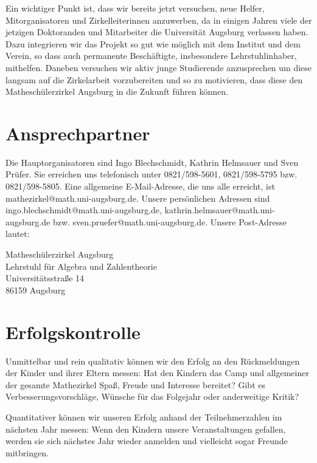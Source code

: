 \documentclass[12pt]{zettel}
\begin{document}
Ein wichtiger Punkt ist, dass wir bereits jetzt versuchen, neue Helfer,
Mitorganisatoren und Zirkelleiterinnen anzuwerben, da in einigen Jahren
viele der jetzigen Doktoranden und Mitarbeiter die Universität Augsburg
verlassen haben. Dazu integrieren wir das Projekt so gut wie möglich mit
dem Institut und dem Verein, so dass auch permanente Beschäftigte,
insbesondere Lehrstuhlinhaber, mithelfen. Daneben versuchen wir aktiv
junge Studierende anzusprechen um diese langsam auf die Zirkelarbeit
vorzubereiten und so zu motivieren, dass diese den Matheschülerzirkel
Augsburg in die Zukunft führen können.


\section{Ansprechpartner}

Die Hauptorganisatoren sind Ingo Blechschmidt, Kathrin Helmsauer und Sven
Prüfer. Sie erreichen uns telefonisch unter 0821/598-5601, 0821/598-5795 bzw.
0821/598-5805. Eine allgemeine E-Mail-Adresse, die uns alle erreicht, ist
\textsf{mathezirkel@math.uni-augsburg.de}. Unsere persönlichen Adressen sind
\textsf{ingo.blechschmidt@math.uni-augsburg.de},
\textsf{kathrin.helmsauer@math.uni-augsburg.de} bzw.
\textsf{sven.pruefer@math.uni-augsburg.de}. Unsere Post-Adresse lautet:

\begin{tabbing}
  Matheschülerzirkel Augsburg \\
  Lehrstuhl für Algebra und Zahlentheorie \\
  Universitätsstraße 14 \\
  86159 Augsburg
\end{tabbing}


\section{Erfolgskontrolle}

Unmittelbar und rein qualitativ können wir den Erfolg an den Rückmeldungen der
Kinder und ihrer Eltern messen: Hat den Kindern das Camp und allgemeiner der
gesamte Mathezirkel Spaß, Freude und Interesse bereitet? Gibt es
Verbesserungsvorschläge, Wünsche für das Folgejahr oder anderweitige Kritik?

Quantitativer können wir unseren Erfolg anhand der Teilnehmerzahlen im nächsten
Jahr messen: Wenn den Kindern unsere Veranstaltungen gefallen, werden sie sich
nächstes Jahr wieder anmelden und vielleicht sogar Freunde mitbringen.
\end{document}
